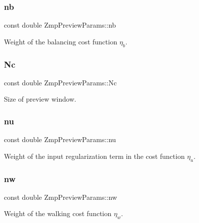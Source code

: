 \hypertarget{structZmpPreviewParams_a906e4172573a97bcdaffa69548024a7e}{}\label{structZmpPreviewParams_a906e4172573a97bcdaffa69548024a7e} 
\subsubsection{\texorpdfstring{nb}{nb}}
{\footnotesize\ttfamily const double Zmp\+Preview\+Params\+::nb}

Weight of the balancing cost function $ \eta_b $. \hypertarget{structZmpPreviewParams_aa2d2913f976860373f8f70abc13a22ba}{}\label{structZmpPreviewParams_aa2d2913f976860373f8f70abc13a22ba} 
\subsubsection{\texorpdfstring{Nc}{Nc}}
{\footnotesize\ttfamily const double Zmp\+Preview\+Params\+::\+Nc}

Size of preview window. \hypertarget{structZmpPreviewParams_a331ce39cf97a39d023ffd3c357d50e7a}{}\label{structZmpPreviewParams_a331ce39cf97a39d023ffd3c357d50e7a} 
\subsubsection{\texorpdfstring{nu}{nu}}
{\footnotesize\ttfamily const double Zmp\+Preview\+Params\+::nu}

Weight of the input regularization term in the cost function $\eta_u$. \hypertarget{structZmpPreviewParams_ae8e33a6d2e4d7d58444b9f38288831e4}{}\label{structZmpPreviewParams_ae8e33a6d2e4d7d58444b9f38288831e4} 
\subsubsection{\texorpdfstring{nw}{nw}}
{\footnotesize\ttfamily const double Zmp\+Preview\+Params\+::nw}

Weight of the walking cost function $ \eta_w $. \hypertarget{structZmpPreviewParams_ae1a666259161913a15bf06832adcbf37}{}\label{structZmpPreviewParams_ae1a666259161913a15bf06832adcbf37} 
